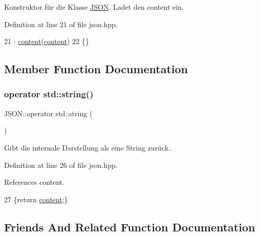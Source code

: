 Konstruktor für die Klasse \mbox{\hyperlink{class_j_s_o_n}{J\+S\+ON}}. Ladet den {\ttfamily content} ein. 

Definition at line 21 of file json.\+hpp.


\begin{DoxyCode}
21                                 : \mbox{\hyperlink{class_j_s_o_n_ad1ace77234b963a2994178ce7f76a181}{content}}(\mbox{\hyperlink{class_j_s_o_n_ad1ace77234b963a2994178ce7f76a181}{content}})
22         \{\}
\end{DoxyCode}


\subsection{Member Function Documentation}
\mbox{\label{class_j_s_o_n_a36da157b300564d8007130b3f62e7c07}} 
\subsubsection{\texorpdfstring{operator std\+::string()}{operator std::string()}}
{\footnotesize\ttfamily J\+S\+O\+N\+::operator std\+::string (\begin{DoxyParamCaption}{ }\end{DoxyParamCaption})\hspace{0.3cm}{\ttfamily [inline]}}

Gibt die internale Darstellung als eine String zurück.. 

Definition at line 26 of file json.\+hpp.



References content.


\begin{DoxyCode}
27         \{\textcolor{keywordflow}{return} \mbox{\hyperlink{class_j_s_o_n_ad1ace77234b963a2994178ce7f76a181}{content}};\}
\end{DoxyCode}


\subsection{Friends And Related Function Documentation}
\mbox{\label{class_j_s_o_n_aeeae42e34eea710cbc1f0a3176fcd662}} 
